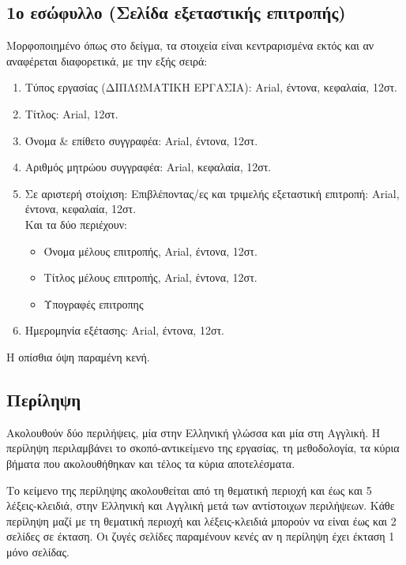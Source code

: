 \documentclass[inscr,ack,preface]{dimscthesis}
\begin{document}
\subsection{1ο εσώφυλλο (Σελίδα εξεταστικής επιτροπής)} \label{second_front_matter_page}

Μορφοποιημένο όπως στο δείγμα, τα στοιχεία είναι κεντραρισμένα εκτός και αν αναφέρεται διαφορετικά, με την εξής σειρά:

\begin{enumerate}
    \item Τύπος εργασίας (ΔΙΠΛΩΜΑΤΙΚΗ ΕΡΓΑΣΙΑ): Arial, έντονα, κεφαλαία, 12στ.
    \item Τίτλος: Arial, 12στ.
    \item Όνομα \& επίθετο συγγραφέα: Arial, έντονα, 12στ.
    \item Αριθμός μητρώου συγγραφέα: Arial, κεφαλαία, 12στ.
    \item Σε αριστερή στοίχιση: Επιβλέποντας/ες και τριμελής εξεταστική επιτροπή: Arial, έντονα, κεφαλαία, 12στ.\\
    Και τα δύο περιέχουν:
    \begin{itemize}
        \item Όνομα μέλους επιτροπής, Arial, έντονα, 12στ.
        \item Τίτλος μέλους επιτροπής, Arial, έντονα, 12στ.
        \item Υπογραφές επιτροπης
    \end{itemize}
    \item Ημερομηνία εξέτασης: Arial, έντονα, 12στ.
\end{enumerate}

Η οπίσθια όψη παραμένη κενή.

\subsection{Περίληψη} \label{abstract}

Ακολουθούν δύο περιλήψεις, μία στην Ελληνική γλώσσα και μία στη Αγγλική.
Η περίληψη περιλαμβάνει το σκοπό-αντικείµενο της εργασίας, τη μεθοδολογία, τα κύρια βήματα που ακολουθήθηκαν και τέλος τα κύρια αποτελέσματα.

Το κείμενο της περίληψης ακολουθείται από τη θεματική περιοχή και έως και 5 λέξεις-κλειδιά, στην Ελληνική και Αγγλική μετά των αντίστοιχων περιλήψεων.
Κάθε περίληψη μαζί με τη θεματική περιοχή και λέξεις-κλειδιά μπορούν να είναι έως και 2 σελίδες σε έκταση.
Οι ζυγές σελίδες παραμένουν κενές αν η περίληψη έχει έκταση 1 μόνο σελίδας.
\end{document}
